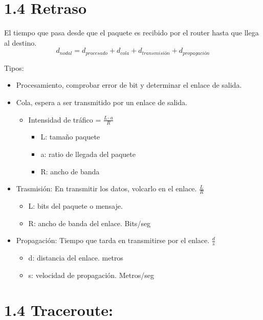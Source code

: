\documentclass[12pt, twoside, openright]{report} %
\begin{document}
\section{1.4 Retraso}

El tiempo que pasa desde que el paquete es recibido por el router hasta
que llega al destino.
$$d_{nodal}= d_{procesado}+d_{cola}+d_{transmisión}+d_{propagación}$$


Tipos:

\begin{itemize}
	\item Procesamiento, comprobar error de bit y determinar el enlace de
	      salida.
	\item Cola, espera a ser transmitido por un enlace de salida.

	      \begin{itemize}
		      \item Intensidad de tráfico = \(\frac{L\cdot a}{R}\)

		            \begin{itemize}
			            \item L: tamaño paquete
			            \item a: ratio de llegada del paquete
			            \item R: ancho de banda
		            \end{itemize}
	      \end{itemize}
	\item Trasmisión: En transmitir los datos, volcarlo en el enlace.
	      \(\frac{L}{R}\)

	      \begin{itemize}
		      \item L: bits del paquete o mensaje.
		      \item R: ancho de banda del enlace. Bits/seg
	      \end{itemize}
	\item Propagación: Tiempo que tarda en transmitirse por el enlace.
	      \(\frac{d}{s}\)

	      \begin{itemize}
		      \item d: distancia del enlace. metros
		      \item s: velocidad de propagación. Metros/seg
	      \end{itemize}

\end{itemize}

\section{1.4 Traceroute:}
\end{document}
